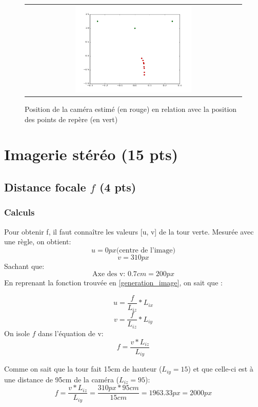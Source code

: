 \documentclass[12pt]{article}
\begin{document}
\begin{figure}[ht]
 \begin{center}
  \begin{tabular}{c}
    \includegraphics[width=0.55\textwidth]{../src/reponse-question-23.png}
  \end{tabular}
 \end{center}
\vspace{-0.25in}
    \caption{Position de la caméra estimé (en rouge) en relation avec la position des points de repère (en vert)}
    \label{impact-bruit-camera}
\end{figure}

\newpage
\section{Imagerie stéréo  (15 pts)}

\subsection{Distance focale $f$ (4 pts)}
\subsubsection{Calculs}
Pour obtenir f, il faut connaître les valeurs [u, v] de la tour verte.
Mesur\'ee avec une r\`egle, on obtient:
\[ u = 0 px \text{(centre de l'image)}\]
\[ v = 310 px\]
Sachant que:
\[ \text{Axe des v: } 0.7cm = 200px \]
En reprenant la fonction trouv\'ee en \ref{generation_image}, on sait que :

\[
    u =  \frac{f}{L_{iz}} * L_{ix}
\]
\[
    v =  \frac{f}{L_{iz}} * L_{iy}
\]
On isole $f$ dans l'\'equation de v:
\[
    f =  \frac{v * L_{iz}}{L_{iy}}
\]

Comme on sait que la tour fait 15cm de hauteur ($L_{iy} = 15$) et que celle-ci est \`a une distance de 95cm de la cam\'era ($L_{iz} = 95$):
\[
    f =  \frac{v * L_{iz}}{L_{iy}} = \frac{310px * 95 cm}{15cm} = 1963.33 px = 2000 px
\]
\end{document}
